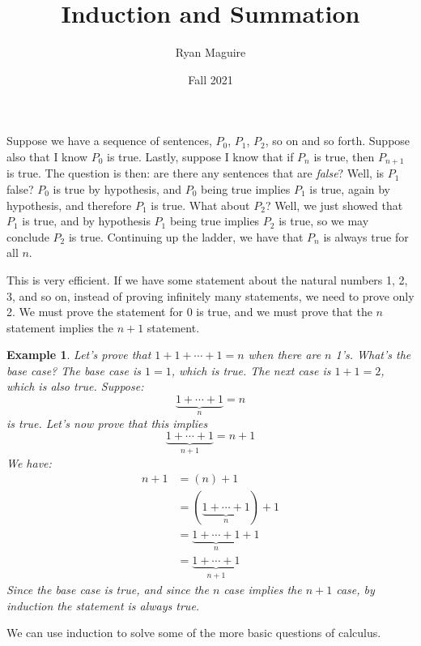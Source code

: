 \documentclass{article}
\title{Induction and Summation}
\author{Ryan Maguire}
\date{Fall 2021}
\theoremstyle{normal}
\newtheorem{example}{Example}
\theoremstyle{plain}
\begin{document}
    \maketitle
    Suppose we have a sequence of sentences, $P_{0}$, $P_{1}$, $P_{2}$, so on
    and so forth. Suppose also that I know $P_{0}$ is true. Lastly, suppose I
    know that if $P_{n}$ is true, then $P_{n+1}$ is true. The question is then:
    are there any sentences that are \textit{false}? Well, is $P_{1}$ false?
    $P_{0}$ is true by hypothesis, and $P_{0}$ being true implies $P_{1}$ is
    true, again by hypothesis, and therefore $P_{1}$ is true. What about
    $P_{2}$? Well, we just showed that $P_{1}$ is true, and by hypothesis
    $P_{1}$ being true implies $P_{2}$ is true, so we may conclude $P_{2}$ is
    true. Continuing up the ladder, we have that $P_{n}$ is always
    true for all $n$.
    \par\hfill\par
    This is very efficient. If we have some statement about the natural numbers
    1, 2, 3, and so on, instead of proving infinitely many statements, we need
    to prove only 2. We must prove the statement for 0 is true, and we must
    prove that the $n$ statement implies the $n+1$ statement.
    \begin{example}
        Let's prove that $1+1+\cdots+1=n$ when there are $n$ 1's. What's the
        base case? The base case is $1=1$, which is true. The next case is
        $1+1=2$, which is also true. Suppose:
        \begin{equation}
            \underbrace{1+\cdots+1}_{n}=n
        \end{equation}
        is true. Let's now prove that this implies
        \begin{equation}
            \underbrace{1+\cdots+1}_{n+1}=n+1
        \end{equation}
        We have:
        \begin{align}
            n+1&=(n)+1\\
                &=(\underbrace{1+\cdots+1}_{n})+1\\
                &=\underbrace{1+\cdots+1}_{n}+1\\
                &=\underbrace{1+\cdots+1}_{n+1}
        \end{align}
        Since the base case is true, and since the $n$ case implies the
        $n+1$ case, by induction the statement is always true.
    \end{example}
    \newpage
    We can use induction to solve some of the more basic questions of calculus.
\end{document}
